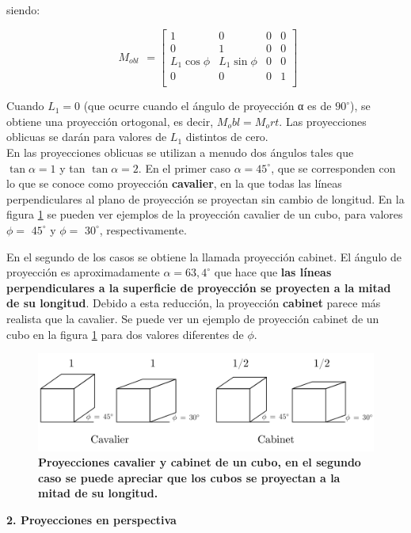 siendo:

\begin{equation}
\begin{array}{rccl}
M_{obl}
\end{array}
=
\left[
\begin{array}{rccl}
1 & 0 & 0 & 0\\
0 & 1 & 0 & 0\\
L_1\cos{\phi} & L_1\sin{\phi} & 0 & 0\\
0 & 0 & 0 & 1\\
\end{array}
\right]
\end{equation}

\vspace{5mm}
Cuando $L_1= 0$ (que ocurre cuando el ángulo de proyección α es de $90^{\circ}$), se obtiene una proyección ortogonal, es decir, $M_obl = M_ort$. Las proyecciones
oblicuas se darán para valores de $L_1$ distintos de cero.\\
En las proyecciones oblicuas se utilizan a menudo dos ángulos tales
que $\tan{\alpha} = 1$ y tan $\tan{\alpha} = 2$. En el primer caso $\alpha = 45^{\circ}$, que se corresponden con lo que se conoce como proyección \textbf{cavalier}, en la que todas las líneas perpendiculares al plano de proyección se proyectan sin cambio de longitud. En la figura \ref{geo-per6} se pueden ver ejemplos de la proyección cavalier de un cubo, para valores $\phi =$ $45^{\circ}$ y $\phi =$ $30^{\circ}$, respectivamente.


En el segundo de los casos se obtiene la llamada proyección cabinet. El ángulo de proyección es aproximadamente $\alpha = 63,4^{\circ}$ que hace que \textbf{las líneas perpendiculares a la superficie de proyección se proyecten a la mitad de su longitud}. Debido a esta reducción, la proyección \textbf{cabinet} parece más realista que la cavalier. Se puede ver un ejemplo de proyección cabinet de un cubo en la figura \ref{geo-per6} para dos valores diferentes de $\phi$.


\begin{figure}[h]
    \includegraphics[width=14cm]{Img/GEO/geo-per-6.png}
    \centering
    \caption{\footnotesize{\textbf{Proyecciones cavalier y cabinet de un cubo, en el segundo caso se puede apreciar que los cubos se proyectan a la mitad de su longitud.}}}
    \label{geo-per6}
\end{figure}
\clearpage
\textbf{2. Proyecciones en perspectiva}

